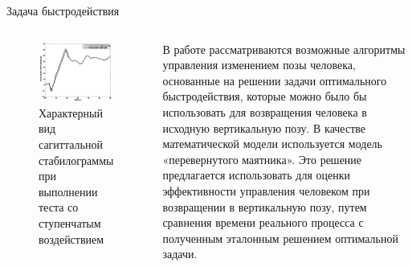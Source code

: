\documentclass[10pt]{beamer}
\begin{document}
\begin{frame}{Задача быстродействия}
	\begin{columns}
		\begin{figure}[h!]
			\includegraphics[width=1\linewidth]{images/stabilos.png}
			\caption{Характерный вид сагиттальной стабилограммы при выполнении теста со ступенчатым воздействием}
		\end{figure}
		В работе рассматриваются возможные алгоритмы управления изменением
		позы человека, основанные на решении задачи оптимального быстродействия,
		которые можно было бы использовать для возвращения человека в исходную 
		вертикальную позу. В качестве математической модели используется модель
		«перевернутого маятника». Это решение предлагается использовать для
		оценки эффективности управления человеком при возвращении в
		вертикальную позу, путем сравнения времени реального процесса с полученным
		эталонным решением оптимальной задачи.
	\end{columns}
\end{frame}
\end{document}

